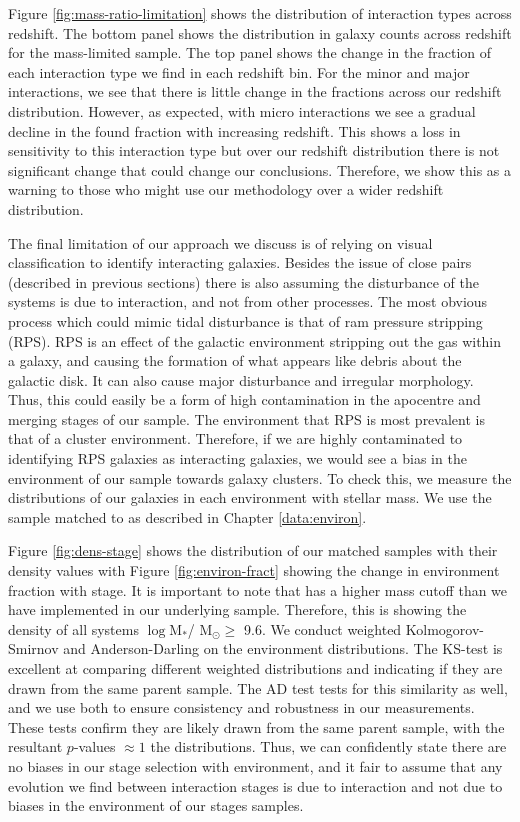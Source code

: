 Figure \ref{fig:mass-ratio-limitation} shows the distribution of interaction types across redshift. The bottom panel shows the distribution in galaxy counts across redshift for the mass-limited sample. The top panel shows the change in the fraction of each interaction type we find in each redshift bin. For the minor and major interactions, we see that there is little change in the fractions across our redshift distribution. However, as expected, with micro interactions we see a gradual decline in the found fraction with increasing redshift. This shows a loss in sensitivity to this interaction type but over our redshift distribution there is not significant change that could change our conclusions. Therefore, we show this as a warning to those who might use our methodology over a wider redshift distribution.

The final limitation of our approach we discuss is of relying on visual classification to identify interacting galaxies. Besides the issue of close pairs (described in previous sections) there is also assuming the disturbance of the systems is due to interaction, and not from other processes. The most obvious process which could mimic tidal disturbance is that of ram pressure stripping (RPS). RPS is an effect of the galactic environment stripping out the gas within a galaxy, and causing the formation of what appears like debris about the galactic disk. It can also cause major disturbance and irregular morphology. Thus, this could easily be a form of high contamination in the apocentre and merging stages of our sample. The environment that RPS is most prevalent is that of a cluster environment. Therefore, if we are highly contaminated to identifying RPS galaxies as interacting galaxies, we would see a bias in the environment of our sample towards galaxy clusters. To check this, we measure the distributions of our galaxies in each environment with stellar mass. We use the sample matched to \citet{2017ApJ...837...16D} as described in Chapter \ref{data:environ}.

Figure \ref{fig:dens-stage} shows the distribution of our matched samples with their density values with Figure \ref{fig:environ-fract} showing the change in environment fraction with stage. It is important to note that \citet{2017ApJ...837...16D} has a higher mass cutoff than we have implemented in our underlying sample. Therefore, this is showing the density of all systems $\log$M$_*$/ M$_\odot \geq$ 9.6. We conduct weighted Kolmogorov-Smirnov \citep[KS-test;][]{an1933sulla} and Anderson-Darling \citep[AD-test;][]{stephens_74} on the environment distributions. The KS-test is excellent at comparing different weighted distributions and indicating if they are drawn from the same parent sample. The AD test tests for this similarity as well, and we use both to ensure consistency and robustness in our measurements. These tests confirm they are likely drawn from the same parent sample, with the resultant $p$-values $\approx1$ the distributions. Thus, we can confidently state there are no biases in our stage selection with environment, and it fair to assume that any evolution we find between interaction stages is due to interaction and not due to biases in the environment of our stages samples.

